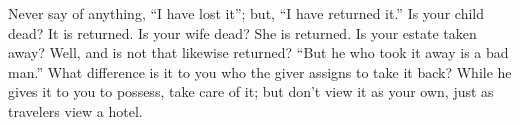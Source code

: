 Never say of anything, ``I have lost it''; but, ``I have returned
it.'' Is your child dead? It is returned. Is your wife dead? She is
returned. Is your estate taken away? Well, and is not that likewise
returned? ``But he who took it away is a bad man.'' What difference
is it to you who the giver assigns to take it back? While he gives
it to you to possess, take care of it; but don't view it as your own,
just as travelers view a hotel. 
